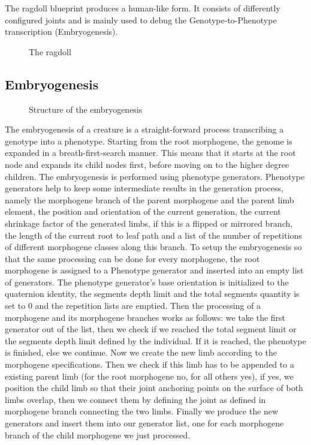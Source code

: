 \documentclass[main]{subfiles}
\begin{document}
The ragdoll blueprint produces a human-like form. It consists of differently configured joints and is mainly used to debug the Genotype-to-Phenotype transcription (Embryogenesis).

\begin{figure}[!h]
\centering
{}
\caption[The ragdoll]{The ragdoll}
\label{figure:ragdoll}
\end{figure}


\subsection{Embryogenesis}

\begin{figure}[!h]
\centering
{}
\caption[Structure of the embryogenesis]{Structure of the embryogenesis}
\label{figure:embryogenesis}
\end{figure}

The embryogenesis of a creature is a straight-forward process transcribing a genotype into a phenotype. Starting from the root morphogene, the genome is expanded in a breath-first-search manner. This means that it starts at the root node and expands its child nodes first, before moving on to the higher degree children. The embryogenesis is performed using phenotype generators. Phenotype generators help to keep some intermediate results in the generation process, namely the morphogene branch of the parent morphogene and the parent limb element, the position and orientation of the current generation, the current shrinkage factor of the generated limbs, if this is a flipped or mirrored branch, the length of the current root to leaf path and a list of the number of repetitions of different morphogene classes along this branch.  To setup the embryogenesis so that the same processing can be done for every morphogene, the root morphogene is assigned to a Phenotype generator and inserted into an empty list of generators. The phenotype generator's base orientation is initialized to the quaternion identity, the segments depth limit and the total segments quantity is set to 0 and the repetition lists are emptied. Then the processing of a morphogene and its morphogene branches works as follows: we take the first generator out of the list, then we check if we reached the total segment limit or the segments depth limit defined by the individual. If it is reached, the phenotype is finished, else we continue. Now we create the new limb according to the morphogene specifications. Then we check if this limb has to be appended to a existing parent limb (for the root morphogene no, for all others yes), if yes, we position the child limb so that their joint anchoring points on the surface of both limbs overlap, then we connect them by defining the joint as defined in morphogene branch connecting the two limbs. Finally we produce the new generators and insert them into our generator list, one for each morphogene branch of the child morphogene we just processed. 
\end{document}
